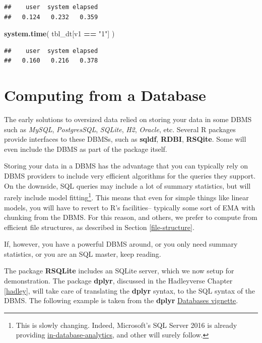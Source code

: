 \documentclass[]{book}
\newenvironment{Shaded}{\begin{snugshade}}{\end{snugshade}}
\newcommand{\KeywordTok}[1]{\textcolor[rgb]{0.13,0.29,0.53}{\textbf{#1}}}
\newcommand{\StringTok}[1]{\textcolor[rgb]{0.31,0.60,0.02}{#1}}
\newcommand{\OperatorTok}[1]{\textcolor[rgb]{0.81,0.36,0.00}{\textbf{#1}}}
\newcommand{\NormalTok}[1]{#1}
\theoremstyle{definition}
\theoremstyle{definition}
\theoremstyle{definition}
\theoremstyle{remark}
\begin{document}
\begin{verbatim}
##    user  system elapsed 
##   0.124   0.232   0.359
\end{verbatim}

\begin{Shaded}
\begin{Highlighting}[]
\KeywordTok{system.time}\NormalTok{( }
\NormalTok{  tbl_dt[v1 }\OperatorTok{==}\StringTok{ "1"}\NormalTok{] }
\NormalTok{  )}
\end{Highlighting}
\end{Shaded}

\begin{verbatim}
##    user  system elapsed 
##   0.160   0.216   0.378
\end{verbatim}

\section{Computing from a Database}\label{computing-from-a-database}

The early solutions to oversized data relied on storing your data in
some DBMS such as \emph{MySQL}, \emph{PostgresSQL}, \emph{SQLite},
\emph{H2}, \emph{Oracle}, etc. Several R packages provide interfaces to
these DBMSs, such as \textbf{sqldf}, \textbf{RDBI}, \textbf{RSQite}.
Some will even include the DBMS as part of the package itself.

Storing your data in a DBMS has the advantage that you can typically
rely on DBMS providers to include very efficient algorithms for the
queries they support. On the downside, SQL queries may include a lot of
summary statistics, but will rarely include model fitting\footnote{This
  is slowly changing. Indeed, Microsoft's SQL Server 2016 is already
  providing
  \href{https://blogs.technet.microsoft.com/dataplatforminsider/2016/03/29/in-database-advanced-analytics-with-r-in-sql-server-2016/}{in-database-analytics},
  and other will surely follow.}. This means that even for simple things
like linear models, you will have to revert to R's facilities--
typically some sort of EMA with chunking from the DBMS. For this reason,
and others, we prefer to compute from efficient file structures, as
described in Section \ref{file-structure}.

If, however, you have a powerful DBMS around, or you only need summary
statistics, or you are an SQL master, keep reading.

The package \textbf{RSQLite} includes an SQLite server, which we now
setup for demonstration. The package \textbf{dplyr}, discussed in the
Hadleyverse Chapter \ref{hadley}, will take care of translating the
\textbf{dplyr} syntax, to the SQL syntax of the DBMS. The following
example is taken from the \textbf{dplyr}
\href{https://cran.r-project.org/web/packages/dplyr/vignettes/databases.html}{Databases
vignette}.
\end{document}
